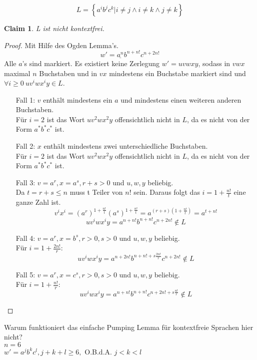 \documentclass[]{article}
\newtheorem{claim}[theorem]{Claim}
\begin{document}
$$L=\left\lbrace a^ib^jc^k|i\neq j \wedge i\neq k \wedge j\neq k \right\rbrace$$
\begin{claim}
L ist nicht kontextfrei.
\end{claim}
\begin{proof}
Mit Hilfe des Ogden Lemma's.
$$w'=\underline{a^n}b^{n+n!}c^{n+2n!}$$
Alle $a$'s sind markiert.
Es existiert keine Zerlegung $w'=uvwxy$, sodass in $vwx$ maximal $n$ Buchstaben und in $vx$ mindestens ein Buchstabe markiert sind und $\forall i\geq0\ uv^iwx^iy\in L$.
\begin{itemize}
\item[Fall 1:] $v$ enth\"alt mindestens ein $a$ und mindestens einen weiteren anderen Buchstaben.\\ 
F\"ur $i=2$ ist das Wort $uv^2wx^2y$ offensichtlich nicht in $L$, da es nicht von der Form $a^*b^*c^*$ ist.
\item[Fall 2:] $x$ enth\"alt mindestens zwei unterschiedliche Buchstaben.\\ 
F\"ur $i=2$ ist das Wort $uv^2wx^2y$ offensichtlich nicht in $L$, da es nicht von der Form $a^*b^*c^*$ ist.
\item[Fall 3:] $v=a^r,x=a^s,r+s>0$ und $u,w,y$ beliebig.\\
Da $t=r+s\leq n$ muss t Teiler von $n!$ sein.
Daraus folgt das $i=1+\frac{n!}{t}$ eine ganze Zahl ist. 
$$v^ix^i=(a^{r})^{1+\frac{n!}{t}}(a^{s})^{1+\frac{n!}{t}}=a^{(r+s)(1+\frac{n!}{t})}=a^{t+n!}$$
$$uv^iwx^iy=a^{n+n!}b^{n+n!}c^{n+2n!}\notin L$$
\item[Fall 4:] $v=a^r,x=b^s,r>0,s>0$ und $u,w,y$ beliebig.\\
F\"ur $i=1+\frac{2n!}{r}$:
$$uv^iwx^iy=a^{n+2n!}b^{n+n!+s\frac{2n!}{r}}c^{n+2n!}\notin L$$
\item[Fall 5:] $v=a^r,x=c^s,r>0,s>0$ und $u,w,y$ beliebig.\\
F\"ur $i=1+\frac{n!}{r}$:
$$uv^iwx^iy=a^{n+n!}b^{n+n!}c^{n+2n!+s\frac{n!}{r}}\notin L$$
\end{itemize}
\end{proof}
\newpage
Warum funktioniert das einfache Pumping Lemma f\"ur kontextfreie Sprachen hier nicht?\\
$n=6$\\
$w'=a^jb^kc^l,j+k+l\geq6,$ O.B.d.A. $j<k<l$
\end{document}
